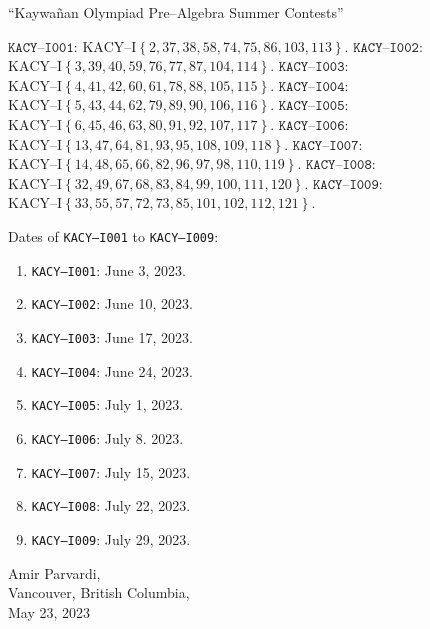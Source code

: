 \documentclass[12pt,a4paper]{memoir}
\theoremstyle{definition}
\begin{document}
{\Large
\noindent ``Kaywañan Olympiad Pre--Algebra Summer Contests''
\large
\begin{tasks}
	\task $\texttt{KACY--I001}$: $\text{KACY--I}\left\{2,37,38,58,74,75,86,103,113\right\}$.
	\task $\texttt{KACY--I002}$: $\text{KACY--I}\left\{3,39,40,59,76,77,87,104,114\right\}$.
	\task $\texttt{KACY--I003}$: $\text{KACY--I}\left\{4,41,42,60,61,78,88,105,115\right\}$.
	\task $\texttt{KACY--I004}$: $\text{KACY--I}\left\{5,43,44,62,79,89,90,106,116\right\}$.
	\task $\texttt{KACY--I005}$: $\text{KACY--I}\left\{6,45,46,63,80,91,92,107,117\right\}$.
	\task $\texttt{KACY--I006}$: $\text{KACY--I}\left\{13,47,64,81,93,95,108,109,118\right\}$.
	\task $\texttt{KACY--I007}$: $\text{KACY--I}\left\{14,48,65,66,82,96,97,98,110,119\right\}$.
	\task $\texttt{KACY--I008}$: $\text{KACY--I}\left\{32,49,67,68,83,84,99,100,111,120\right\}$.
	\task $\texttt{KACY--I009}$: $\text{KACY--I}\left\{33,55,57,72,73,85,101,102,112,121\right\}$.
\end{tasks}  
\Large
Dates of \texttt{KACY--I001} to \texttt{KACY--I009}:
\begin{enumerate}
	\item \texttt{KACY--I001}: June 3, 2023.
	\item \texttt{KACY--I002}: June 10, 2023.
	\item \texttt{KACY--I003}: June 17, 2023.
	\item \texttt{KACY--I004}: June 24, 2023.
	\item \texttt{KACY--I005}: July 1, 2023.
	\item \texttt{KACY--I006}: July 8. 2023.
	\item \texttt{KACY--I007}: July 15, 2023.
	\item \texttt{KACY--I008}: July 22, 2023.
	\item \texttt{KACY--I009}: July 29, 2023.
\end{enumerate}  
\LARGE
\begin{flushright}
	Amir Parvardi,\\
	Vancouver, British Columbia,\\
	May 23, 2023
\end{flushright}
}
\newpage
\normalsize
\tableofcontents\label{TOC}
\listoffigures

\mainmatter
\normalsize
\pagestyle{fancy}
\fancyhf{}
\end{document}

